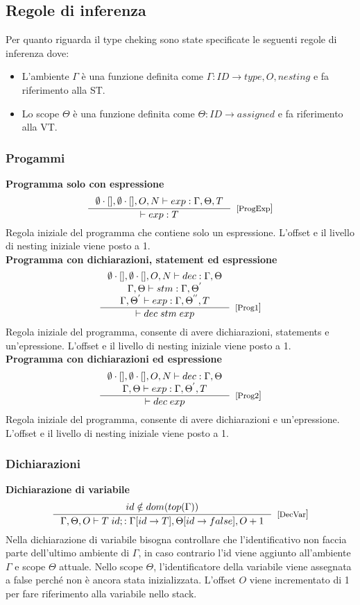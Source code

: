 \subsection{Regole di inferenza}
Per quanto riguarda il type cheking sono state specificate le seguenti regole di inferenza dove:
\begin{itemize}
    \item L'ambiente $\Gamma$ è una funzione definita come $\Gamma:ID \rightarrow type, O, nesting $ e fa riferimento alla ST.
    \item Lo scope $\Theta$ è una funzione definita come $\Theta:ID \rightarrow assigned$ e fa riferimento alla VT.
\end{itemize}

\subsubsection{Progammi}
\textbf{Programma solo con espressione}
\[
\inference{\emptyset \cdot [], \emptyset \cdot [], O, N \vdash exp:\Gamma, \Theta, T}{ \vdash exp: T }[[ProgExp]]
\]
Regola iniziale del programma che contiene solo un espressione. L'offset e il livello di nesting iniziale viene posto a 1. \\

\textbf{Programma con dichiarazioni, statement ed espressione}
\[
\inference{\emptyset \cdot [], \emptyset \cdot [], O, N \vdash dec:\Gamma, \Theta \\ \Gamma, \Theta \vdash stm:\Gamma, \Theta^{'} \\ \Gamma, \Theta^{'} \vdash exp:\Gamma, \Theta^{''}, T}{ \vdash dec \; stm \; exp}[[Prog1]]
\]
Regola iniziale del programma, consente di avere dichiarazioni, statements e un'epressione. L'offset e il livello di nesting iniziale viene posto a 1. \\

\textbf{Programma con dichiarazioni ed espressione}
\[
\inference{\emptyset \cdot [], \emptyset \cdot [], O, N \vdash dec:\Gamma, \Theta \\ \Gamma, \Theta \vdash exp:\Gamma, \Theta^{'}, T}{ \vdash dec \; exp}[[Prog2]]
\]
Regola iniziale del programma, consente di avere dichiarazioni e un'epressione. L'offset e il livello di nesting iniziale viene posto a 1. \\

\subsubsection{Dichiarazioni}
\textbf{Dichiarazione di variabile}
\[
\inference{id \notin dom(top(\Gamma))}{\Gamma, \Theta, O \vdash T \; id;: \Gamma[id \rightarrow T], \Theta[id \rightarrow false] , O+1}[[DecVar]]
\]
Nella dichiarazione di variabile bisogna controllare che l'identificativo non faccia parte dell'ultimo ambiente di $\Gamma$, in caso contrario l'id viene aggiunto all'ambiente $\Gamma$ e scope $\Theta$ attuale. Nello scope $\Theta$, l'identificatore della variabile viene assegnata a false perché non è ancora stata inizializzata. L'offset $O$ viene incrementato di 1 per fare riferimento alla variabile nello stack.\\

